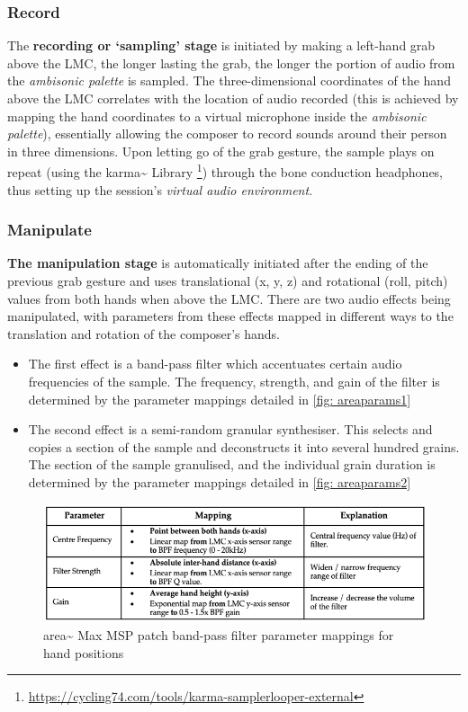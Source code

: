 \subsubsection{Record}\label{sec: area-system-software-record}
The \textbf{recording or `sampling' stage} is initiated by making a left-hand grab above the LMC, the longer lasting the grab, the longer the portion of audio from the \textit{ambisonic palette} is sampled. The three-dimensional coordinates of the hand above the LMC correlates with the location of audio recorded (this is achieved by mapping the hand coordinates to a virtual microphone inside the \textit{ambisonic palette}), essentially allowing the composer to record sounds around their person in three dimensions. Upon letting go of the grab gesture, the sample plays on repeat (using the karma\textasciitilde{} Library \footnote{\url{https://cycling74.com/tools/karma-samplerlooper-external}}) through the bone conduction headphones, thus setting up the session's \textit{virtual audio environment}.

\subsubsection{Manipulate}\label{sec: area-system-software-manip}
\textbf{The manipulation stage} is automatically initiated after the ending of the previous grab gesture and uses translational (x, y, z) and rotational (roll, pitch) values from both hands when above the LMC. There are two audio effects being manipulated, with parameters from these effects mapped in different ways to the translation and rotation of the composer's hands.
\begin{itemize}
    \item The first effect is a band-pass filter which accentuates certain audio frequencies of the sample. The frequency, strength, and gain of the filter is determined by the parameter mappings detailed in \autoref{fig: areaparams1}
    \item The second effect is a semi-random granular synthesiser. This selects and copies a section of the sample and deconstructs it into several hundred grains. The section of the sample granulised, and the individual grain duration is determined by the parameter mappings detailed in \autoref{fig: areaparams2} 
\end{itemize}
\begin{figure}
    \centering
    \includegraphics[width=1\linewidth]{figures/05-area/areatechnical_param1.png}
    \caption{area\textasciitilde{} Max MSP patch band-pass filter parameter mappings for hand positions}
    \label{fig: areaparams1}
\end{figure}

